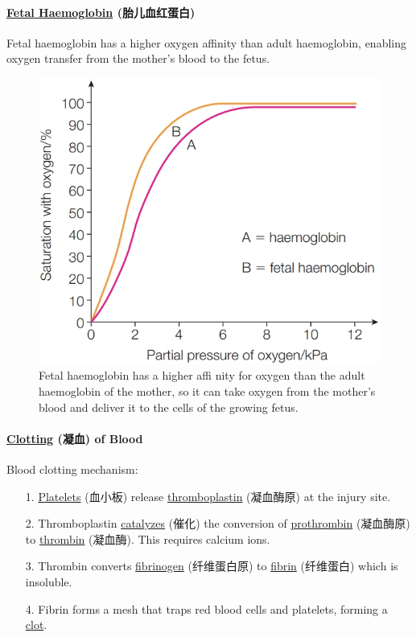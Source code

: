 \paragraph{\underline{Fetal Haemoglobin} (胎儿血红蛋白)}
Fetal haemoglobin has a higher oxygen affinity than adult haemoglobin, enabling oxygen transfer from the mother's blood to the
fetus.
\begin{figure}[H]
    \centering
    \includegraphics[scale=0.25]{Biology/1B/Images/1B-2-5.png}
    \caption{Fetal haemoglobin has a higher affi nity for oxygen than the adult haemoglobin of the mother, so it can take oxygen
    from the mother's blood and deliver it to the cells of the growing fetus.}
\end{figure}

\paragraph{\underline{Clotting} (凝血) of Blood} Blood clotting mechanism:
\begin{itemize}
    \item[1.] \underline{Platelets} (血小板) release \underline{thromboplastin} (凝血酶原) at the injury site.
    \item[2.] Thromboplastin \underline{catalyzes} (催化) the conversion of \underline{prothrombin} (凝血酶原) to
    \underline{thrombin} (凝血酶). This requires calcium ions.
    \item[3.] Thrombin converts \underline{fibrinogen} (纤维蛋白原) to \underline{fibrin} (纤维蛋白) which is insoluble.
    \item[4.] Fibrin forms a mesh that traps red blood cells and platelets, forming a \underline{clot}.
\end{itemize}